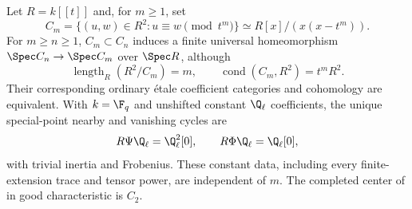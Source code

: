 \begin{finding}\label{f:collision}
Let $R=k[[t]]$ and, for $m\ge1$, set
\[
 C_m=\{(u,w)\in R^2:u\equiv w\pmod{t^m}\}
     \simeq R[x]/(x(x-t^m)).
\]
For $m\ge n\ge1$, $C_m\subset C_n$ induces a finite universal
homeomorphism $\Spec C_n\to\Spec C_m$ over $\Spec R$, although
\[
 \operatorname{length}_R(R^2/C_m)=m,\qquad
 \operatorname{cond}(C_m,R^2)=t^mR^2.
\]
Their corresponding ordinary \'etale coefficient categories and
cohomology are equivalent. With $k=\F_q$ and unshifted constant
$\Q_\ell$ coefficients, the unique special-point nearby and vanishing
cycles are
\[
 R\Psi\Q_\ell=\Q_\ell^2[0],\qquad
 R\Phi\Q_\ell=\Q_\ell[0],
\]
with trivial inertia and Frobenius. These constant data, including every
finite-extension trace and tensor power, are independent of $m$.
The completed center of  in good characteristic is $C_2$.
\end{finding}
